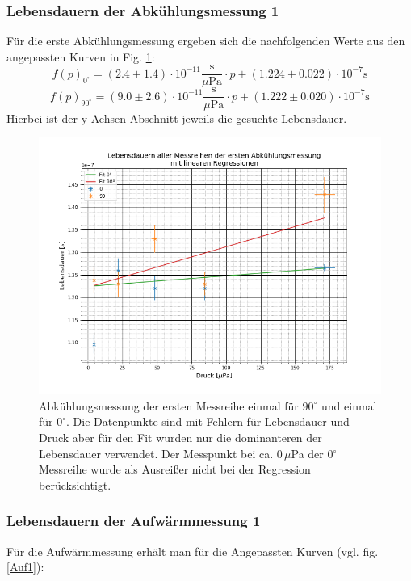 \subsubsection{Lebensdauern der Abkühlungsmessung 1}
Für die erste Abkühlungsmessung ergeben sich die nachfolgenden Werte aus den angepassten Kurven in Fig. \ref{Abk1}:
\begin{equation*}
	f(p)_{0^\circ}=(2.4 \pm 1.4)\cdot 10^{-11} \frac{\text{s}}{\text{$\mu$Pa}}\cdot p + (1.224\pm 0.022)\cdot 10^{-7} \text{s}
\end{equation*}
\begin{equation*}
	f(p)_{90^\circ}=(9.0\pm 2.6)\cdot 10^{-11} \frac{\text{s}}{\text{$\mu$Pa}}\cdot p + (1.222\pm 0.020)\cdot 10^{-7} \text{s}
\end{equation*}
Hierbei ist der y-Achsen Abschnitt jeweils die gesuchte Lebensdauer.
\begin{figure}[ht]
	\includegraphics[scale=0.5]{Bild/Abk1}
	\centering
	\caption[Druck zu Lebensdauer Fit für Abkühlung 1]{Abkühlungsmessung der ersten Messreihe einmal für $90^\circ$ und einmal für $0^\circ$. Die Datenpunkte sind mit Fehlern für Lebensdauer und Druck aber für den Fit wurden nur die dominanteren der Lebensdauer verwendet. Der Messpunkt bei ca. $0\,\mu$Pa der 0$^\circ$ Messreihe wurde als Ausreißer nicht bei der Regression berücksichtigt.}
	\label{Abk1}
\end{figure}
\FloatBarrier
\subsubsection{Lebensdauern der Aufwärmmessung 1}
Für die Aufwärmmessung erhält man für die Angepassten Kurven (vgl. fig. \ref{Auf1}):

